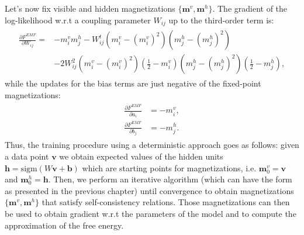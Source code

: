 Let's now fix visible and hidden magnetizations $\{ \mathbf{m}^v, \mathbf{m}^h \}$. The gradient of the log-likelihood w.r.t a coupling parameter $W_{ij}$ up to the third-order term is:
\begin{align*}
\begin{split}
\frac{\partial F^{EMF}}{\partial W_{ij}} = & -m_i^v m_j^h - W_{ij}^t(m_i^v - (m_i^v)^2)(m_j^h - (m_j^h)^2) \\
 & - 2W_{ij}^2 (m_i^v - (m_i^v)^2)(\frac{1}{2} - m_i^v)(m_j^h - (m_j^h)^2)(\frac{1}{2} - m_j^h),
\end{split}
\end{align*}
while the updates for the bias terms are just negative of the fixed-point magnetizations:
\begin{align}
\begin{split}\frac{\partial F^{EMF}}{\partial a_i} &= -m_i^v, \\
\frac{\partial F^{EMF}}{\partial b_j} & = -m_j^h.
\end{split}
\end{align}
Thus, the training procedure using a deterministic approach goes as follows: given a data point $\mathbf{v}$ we obtain expected values of the hidden units $\mathbf{h} = \text{sigm} ( W\mathbf{v} + \mathbf{b})$ which are starting points for magnetizations, i.e. $\mathbf{m}^v_0 = \mathbf{v}$ and $\mathbf{m}^{h}_0 = \mathbf{h}$. Then, we perform an iterative algorithm (which can have the form as presented in the previous chapter) until convergence to obtain magnetizations $\{ \mathbf{m}^v,\mathbf{m}^h\}$ that satisfy self-consistency relations. Those magnetizations can then be used to obtain gradient w.r.t the parameters of the model and to compute the approximation of the free energy.
 
